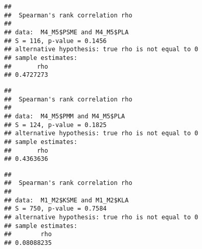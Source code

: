 \documentclass[]{article}
\newenvironment{Shaded}{\begin{snugshade}}{\end{snugshade}}
\newcommand{\KeywordTok}[1]{\textcolor[rgb]{0.13,0.29,0.53}{\textbf{{#1}}}}
\newcommand{\DataTypeTok}[1]{\textcolor[rgb]{0.13,0.29,0.53}{{#1}}}
\newcommand{\StringTok}[1]{\textcolor[rgb]{0.31,0.60,0.02}{{#1}}}
\newcommand{\CommentTok}[1]{\textcolor[rgb]{0.56,0.35,0.01}{\textit{{#1}}}}
\newcommand{\OtherTok}[1]{\textcolor[rgb]{0.56,0.35,0.01}{{#1}}}
\newcommand{\NormalTok}[1]{{#1}}
\begin{document}
\begin{verbatim}
## 
##  Spearman's rank correlation rho
## 
## data:  M4_M5$PSME and M4_M5$PLA
## S = 116, p-value = 0.1456
## alternative hypothesis: true rho is not equal to 0
## sample estimates:
##       rho 
## 0.4727273
\end{verbatim}

\begin{Shaded}
\end{Shaded}

\begin{verbatim}
## 
##  Spearman's rank correlation rho
## 
## data:  M4_M5$PMM and M4_M5$PLA
## S = 124, p-value = 0.1825
## alternative hypothesis: true rho is not equal to 0
## sample estimates:
##       rho 
## 0.4363636
\end{verbatim}

\begin{Shaded}
\end{Shaded}

\begin{verbatim}
## 
##  Spearman's rank correlation rho
## 
## data:  M1_M2$KSME and M1_M2$KLA
## S = 750, p-value = 0.7584
## alternative hypothesis: true rho is not equal to 0
## sample estimates:
##        rho 
## 0.08088235
\end{verbatim}

\begin{Shaded}
\end{Shaded}
\end{document}
